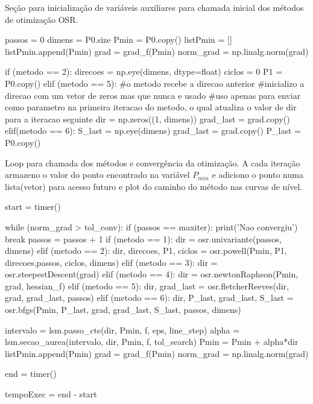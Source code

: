 \documentclass[10pt, a4paper]{article}
\begin{document}
Seção para inicialização de variáveis auxiliares para chamada inicial dos métodos de otimização OSR.

\begin{python}
  passos = 0
  dimens = P0.size
  Pmin = P0.copy()
  listPmin = []
  listPmin.append(Pmin)
  grad = grad_f(Pmin)
  norm_grad = np.linalg.norm(grad)

  if (metodo == 2):
      direcoes = np.eye(dimens, dtype=float)
      ciclos = 0
      P1 = P0.copy()
  elif (metodo == 5):
      #o metodo recebe a direcao anterior 
      #inicializo a direcao com um vetor de zeros mas que nunca e usado
      #uso apenas para enviar como parametro na primeira iteracao do metodo, o qual atualiza o valor de dir para a iteracao seguinte
      dir = np.zeros((1, dimens))
      grad_last = grad.copy()
  elif(metodo == 6):
      S_last = np.eye(dimens)
      grad_last = grad.copy()
      P_last = P0.copy()
\end{python}

Loop para chamada dos métodos e convergência da otimização. A cada iteração armazeno o valor do ponto encontrado na variável
$P_{min}$ e adiciono o ponto numa lista(vetor) para acesso futuro e plot do caminho do método nas curvas de nível.

\begin{python}
  start = timer()

  while (norm_grad > tol_conv):
      if (passos == maxiter):
          print('Nao convergiu')
          break
      passos = passos + 1
      if (metodo == 1):
          dir = osr.univariante(passos, dimens)
      elif (metodo == 2):
          dir, direcoes, P1, ciclos = osr.powell(Pmin, P1, direcoes,passos, ciclos, dimens)
      elif (metodo == 3):
          dir = osr.steepestDescent(grad)
      elif (metodo == 4):
          dir = osr.newtonRaphson(Pmin, grad, hessian_f)
      elif (metodo == 5):
          dir, grad_last = osr.fletcherReeves(dir, grad, grad_last, passos)
      elif (metodo == 6):
          dir, P_last, grad_last, S_last = osr.bfgs(Pmin, P_last, grad, grad_last, S_last, passos, dimens)
      
      intervalo = lsm.passo_cte(dir, Pmin, f, eps, line_step)
      alpha = lsm.secao_aurea(intervalo, dir, Pmin, f, tol_search)
      Pmin = Pmin + alpha*dir
      listPmin.append(Pmin)
      grad = grad_f(Pmin)
      norm_grad = np.linalg.norm(grad)    

  end = timer()

  tempoExec = end - start
\end{python}
\end{document}
